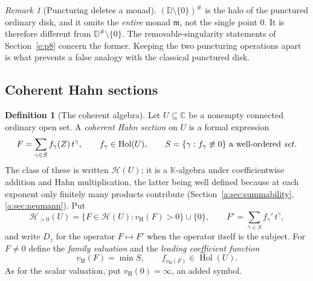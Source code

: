 \documentclass[11pt,a4paper]{article}
\numberwithin{equation}{section}
\theoremstyle{definition}
\newtheorem{definition}[theorem]{Definition}
\theoremstyle{remark}
\newtheorem{remark}[theorem]{Remark}
\theoremstyle{plain}
\newcommand{\K}{\mathbb K}
\newcommand{\CC}{\mathbb C}
\newcommand{\mm}{\mathfrak m}
\DeclareMathOperator{\Hol}{Hol}
\newcommand{\tm}{t}
\newcommand{\halo}[1]{#1^{\#}}
\newcommand{\Hc}{\mathcal H}
\newcommand{\vH}{v_{\mathrm H}}
\begin{document}
\begin{remark}[Puncturing deletes a monad]\label{c:p4:rk-punctured}
$\halo{(\mathbb D\setminus\{0\})}$ is the halo of the punctured ordinary
disk, and it omits the \emph{entire} monad $\mm$, not the single point
$0$. It is therefore different from $\halo{\mathbb D}\setminus\{0\}$.
The removable-singularity statements of Section~\ref{e:p8} concern the
former. Keeping the two puncturing operations apart is what prevents a
false analogy with the classical punctured disk.
\end{remark}

\subsection{Coherent Hahn sections}
\label{c:p4:def}

\begin{definition}[The coherent algebra]\label{c:p4:def-HU}
Let $U\subseteq\CC$ be a nonempty connected ordinary open set. A
\emph{coherent Hahn section} on $U$ is a formal expression
\begin{equation}\label{c:p4:eq-HU}
 F=\sum_{\gamma\in S}f_\gamma(Z)\,\tm^\gamma,
 \qquad f_\gamma\in\Hol(U),
 \qquad S=\{\gamma:f_\gamma\not\equiv0\}
 \ \text{a well-ordered \emph{set}}.
\end{equation}
The class of these is written $\Hc(U)$; it is a $\K$-algebra under
coefficientwise addition and Hahn multiplication, the latter being
well defined because at each exponent only finitely many products
contribute (Section~\ref{a:sec:summability}, \ref{a:sec:neumann}). Put
\[
 \Hc_{>0}(U)=\{F\in\Hc(U): \vH(F)>0\}\cup\{0\},
 \qquad
 F'=\sum_{\gamma\in S}f_\gamma'\,\tm^\gamma,
\]
and write $D_z$ for the operator $F\mapsto F'$ when the operator itself
is the subject. For $F\ne0$ define the \emph{family valuation} and the
\emph{leading coefficient function}
\[
 \vH(F)=\min S,\qquad f_{\vH(F)}\in\Hol(U).
\]
As for the scalar valuation, put $\vH(0)=\infty$, an added symbol.
\end{definition}
\end{document}

